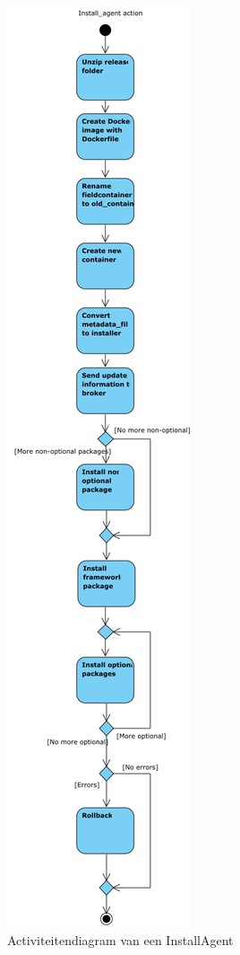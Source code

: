 \begin{figure}[!ht]
\centering
\includegraphics[scale=0.5]{afbeelding/flowcharts/Installagent.png}
\caption{Activiteitendiagram van een InstallAgent}
\label{fig:flow:installAgent}
\end{figure}

